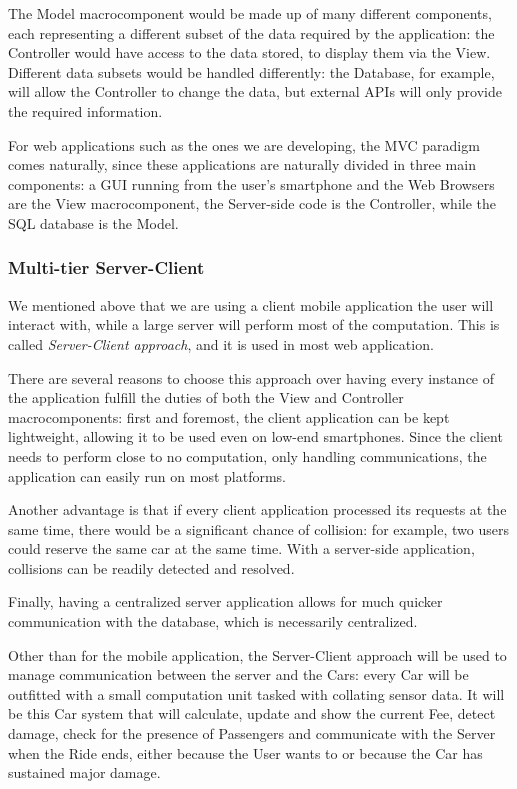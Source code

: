 \documentclass[12pt]{article}
\begin{document}
The Model macrocomponent would be made up of many different components, each representing a different subset of the data required by the application: the Controller would have access to the data stored, to display them via the View. Different data subsets would be handled differently: the Database, for example, will allow the Controller to change the data, but external APIs will only provide the required information.

For web applications such as the ones we are developing, the MVC paradigm comes naturally, since these applications are naturally divided in three main components: a GUI running from the user's smartphone and the Web Browsers are the View macrocomponent, the Server-side code is the Controller, while the SQL database is the Model.

\subsubsection{Multi-tier Server-Client}
We mentioned above that we are using a client mobile application the user will interact with, while a large server will perform most of the computation. This is called \emph{Server-Client approach}, and it is used in most web application.

There are several reasons to choose this approach over having every instance of the application fulfill the duties of both the View and Controller macrocomponents: first and foremost, the client application can be kept lightweight, allowing it to be used even on low-end smartphones. Since the client needs to perform close to no computation, only handling communications, the application can easily run on most platforms.

Another advantage is that if every client application processed its requests at the same time, there would be a significant chance of collision: for example, two users could reserve the same car at the same time. With a server-side application, collisions can be readily detected and resolved.

Finally, having a centralized server application allows for much quicker communication with the database, which is necessarily centralized.

Other than for the mobile application, the Server-Client approach will be used to manage communication between the server and the Cars: every Car will be outfitted with a small computation unit tasked with collating sensor data. It will be this Car system that will calculate, update and show the current Fee, detect damage, check for the presence of Passengers and communicate with the Server when the Ride ends, either because the User wants to or because the Car has sustained major damage.
\end{document}
